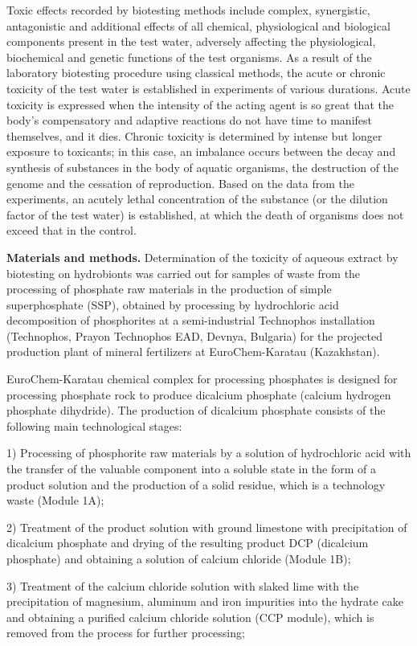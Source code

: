 \begin{multicols}{2}
Toxic effects recorded by biotesting methods include complex,
synergistic, antagonistic and additional effects of all chemical,
physiological and biological components present in the test water,
adversely affecting the physiological, biochemical and genetic functions
of the test organisms. As a result of the laboratory biotesting
procedure using classical methods, the acute or chronic toxicity of the
test water is established in experiments of various durations. Acute
toxicity is expressed when the intensity of the acting agent is so great
that the body's compensatory and adaptive reactions do not have time to
manifest themselves, and it dies. Chronic toxicity is determined by
intense but longer exposure to toxicants; in this case, an imbalance
occurs between the decay and synthesis of substances in the body of
aquatic organisms, the destruction of the genome and the cessation of
reproduction. Based on the data from the experiments, an acutely lethal
concentration of the substance (or the dilution factor of the test
water) is established, at which the death of organisms does not exceed
that in the control.

{\bfseries Materials and methods.} Determination of the toxicity of aqueous
extract by biotesting on hydrobionts was carried out for samples of
waste from the processing of phosphate raw materials in the production
of simple superphosphate (SSP), obtained by processing by hydrochloric
acid decomposition of phosphorites at a semi-industrial Technophos
installation (Technophos, Prayon Technophos EAD, Devnya, Bulgaria) for
the projected production plant of mineral fertilizers at
EuroChem-Karatau (Kazakhstan).

EuroChem-Karatau chemical complex for processing phosphates is designed
for processing phosphate rock to produce dicalcium phosphate (calcium
hydrogen phosphate dihydride). The production of dicalcium phosphate
consists of the following main technological stages:

1) Processing of phosphorite raw materials by a solution of hydrochloric
acid with the transfer of the valuable component into a soluble state in
the form of a product solution and the production of a solid residue,
which is a technology waste (Module 1A);

2) Treatment of the product solution with ground limestone with
precipitation of dicalcium phosphate and drying of the resulting product
DCP (dicalcium phosphate) and obtaining a solution of calcium chloride
(Module 1B);

3) Treatment of the calcium chloride solution with slaked lime with the
precipitation of magnesium, aluminum and iron impurities into the
hydrate cake and obtaining a purified calcium chloride solution (CCP
module), which is removed from the process for further processing;


\end{multicols}
